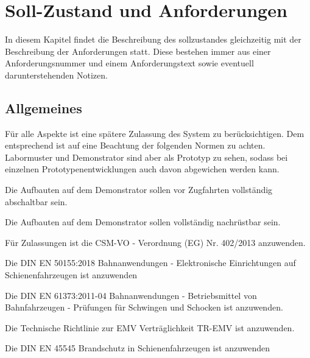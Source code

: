 \section{Soll-Zustand und Anforderungen}
In diesem Kapitel findet die Beschreibung des sollzustandes gleichzeitig %
mit der Beschreibung der Anforderungen statt. Diese bestehen immer aus einer Anforderungsnummer und einem Anforderungstext sowie eventuell darunterstehenden Notizen.\par

\subsection{Allgemeines}
Für alle Aspekte ist eine spätere Zulassung des System zu berücksichtigen. Dem entsprechend ist auf eine Beachtung der folgenden Normen zu achten. Labormuster und Demonstrator sind aber als Prototyp zu sehen, sodass bei einzelnen Prototypenentwicklungen auch davon abgewichen werden kann.
\begin{feat}
Die Aufbauten auf dem Demonstrator sollen vor Zugfahrten vollständig abschaltbar sein.
\end{feat}
\begin{feat}
Die Aufbauten auf dem Demonstrator sollen vollständig nachrüstbar sein.
\end{feat}
\begin{feat}
Für Zulassungen ist die CSM-VO - Verordnung (EG) Nr. 402/2013 anzuwenden.
\end{feat}
\begin{feat}
Die \acrshort{DIN} \acrshort{EN} 50155:2018 Bahnanwendungen - Elektronische Einrichtungen auf Schienenfahrzeugen ist anzuwenden
\end{feat}
\begin{feat}
Die \acrshort{DIN} \acrshort{EN} 61373:2011-04 Bahnanwendungen - Betriebsmittel von Bahnfahrzeugen - Prüfungen für Schwingen und Schocken ist anzuwenden.
\end{feat}
\begin{feat}
Die Technische Richtlinie zur EMV Verträglichkeit TR-EMV ist anzuwenden.
\end{feat}
\begin{feat}
Die \acrshort{DIN} \acrshort{EN} 45545 Brandschutz in Schienenfahrzeugen ist anzuwenden
\end{feat}

